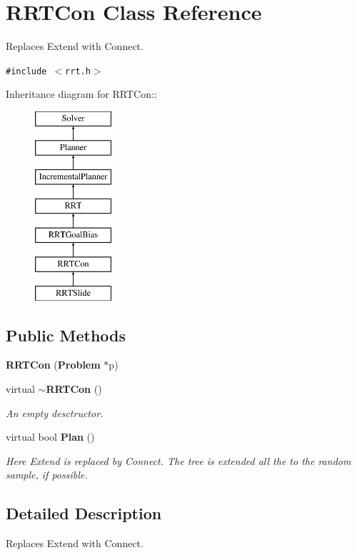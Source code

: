 \section{RRTCon  Class Reference}
\label{classRRTCon}
Replaces Extend with Connect. 


{\tt \#include $<$rrt.h$>$}

Inheritance diagram for RRTCon::\begin{figure}[H]
\begin{center}
\leavevmode
\includegraphics[height=7cm]{classRRTCon}
\end{center}
\end{figure}
\subsection*{Public Methods}
\begin{CompactItemize}
\item 
{\bf RRTCon} ({\bf Problem} $\ast$p)
\item 
virtual {\bf $\sim$RRTCon} ()
\begin{CompactList}\small\item\em An empty desctructor.\item\end{CompactList}\item 
virtual bool {\bf Plan} ()
\begin{CompactList}\small\item\em Here Extend is replaced by Connect. The tree is extended all the to the random sample, if possible.\item\end{CompactList}\end{CompactItemize}


\subsection{Detailed Description}
Replaces Extend with Connect.


